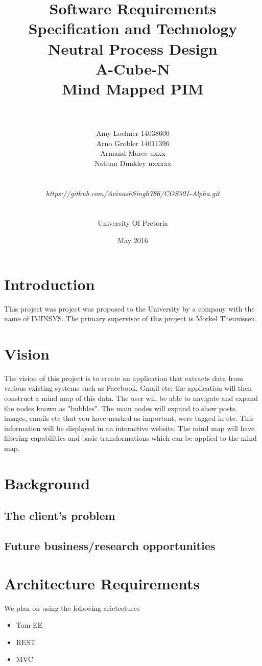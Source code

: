\documentclass[a4paper]{article}
\title{\huge Software Requirements Specification and Technology Neutral Process Design
	\\A-Cube-N
	\\Mind Mapped PIM}
\author{\\\\Amy Lochner 14038600\\ Arno Grobler 14011396 \\
	Armand Maree uxxx\\ Nathan Dunkley uxxxxx \\

	\\
	\\\textit{https://github.com/AvinashSingh786/COS301-Alpha.git}
	\\
	\\
	\\ University Of Pretoria\\}
\date{May 2016}
\begin{document}
	
	\maketitle

	\newpage

	\tableofcontents
	\newpage
	
	\section{Introduction}
	This project was project was proposed to the University by a company with the name of IMINSYS. The primary supervisor of this project is Morkel Theunissen.

	
	\section{Vision}
	The vision of this project is to create an application that extracts data from various existing systems such as Facebook, Gmail etc; the application will then construct a mind map of this data. The user will be able to navigate and expand the nodes known as "bubbles". The main nodes will expand to show posts, images, emails etc that you have marked as important, were tagged in etc. This information will be displayed in an interactive website. The mind map will have filtering capabilities and basic transformations which can be applied to the mind map.
	
	\section{Background}
	\subsection{The client's problem}

	
	\subsection{Future business/research opportunities}

	
	\section{Architecture Requirements}
    
    We plan on using the following arictectures
	\begin{itemize}
	    \item Tom-EE
	    \item REST 
	    \item MVC
	\end{itemize}
	
\end{document}
